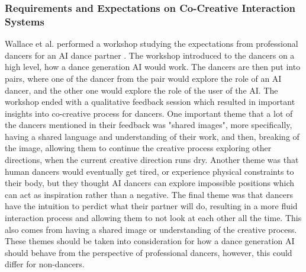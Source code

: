 \documentclass[final,5p,times,twocolumn,authoryear]{article}
\begin{document}
\subsubsection{Requirements and Expectations on Co-Creative Interaction Systems}
Wallace et al. performed a workshop studying the expectations from
professional dancers for an AI dance partner \cite{Wallace2023}. The workshop introduced to
the dancers on a high level, how a dance generation AI would work. The
dancers are then put into pairs, where one of the dancer from the pair
would explore the role of an AI dancer, and the other one would explore
the role of the user of the AI. The workshop ended with a qualitative
feedback session which resulted in important insights into co-creative
process for dancers. One important theme that a lot of the dancers
mentioned in their feedback was "shared images", more specifically,
having a shared language and understanding of their work, and then,
breaking of the image, allowing them to continue the creative process
exploring other directions, when the current creative direction runs
dry. Another theme was that human dancers would eventually get tired, or
experience physical constraints to their body, but they thought AI
dancers can explore impossible positions which can act as inspiration
rather than a negative. The final theme was that dancers have the
intuition to perdict what their partner will do, resulting in a more
fluid interaction process and allowing them to not look at each other
all the time. This also comes from having a shared image or
understanding of the creative process. These themes should be taken into
consideration for how a dance generation AI should behave from the
perspective of professional dancers, however, this could differ for
non-dancers.
\end{document}
